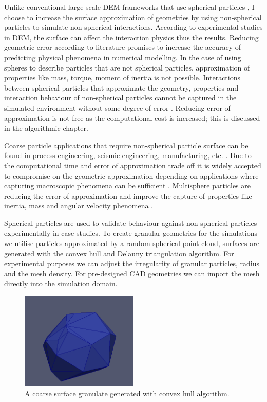 \documentclass[times,12pt]{article}
\begin{document}
Unlike conventional large scale DEM frameworks that use spherical particles \cite{Garcia2009, Hohner2014}, I choose to increase the surface approximation of geometries by using non-spherical particles to simulate non-spherical interactions. According to experimental studies \cite{Kruggel-Emden2008} in DEM, the surface can affect the interaction physics thus the results. Reducing geometric error according to  literature \cite{Li2015} promises to increase the accuracy of predicting physical phenomena in numerical modelling. In the case of using spheres to describe particles that are not spherical particles, approximation of properties like mass, torque, moment of inertia is not possible. Interactions between spherical particles that approximate the geometry, properties and interaction behaviour of non-spherical particles cannot be captured in the simulated environment without some degree of error \cite{Markauskas2010}. Reducing error of approximation is not free as the computational cost is increased; this is discussed in the algorithmic chapter.

Coarse particle applications that require non-spherical particle surface can be found in process engineering, seismic engineering, manufacturing, etc. \cite{Parteli2013}. Due to the computational time and error of approximation trade off it is widely accepted to compromise on the geometric approximation depending on applications where capturing macroscopic phenomena can be sufficient \cite{Kruggel-Emden2008}. Multisphere particles are reducing the error of approximation and improve the capture of properties like inertia, mass and angular velocity phenomena \cite{Kruggel-Emden2008}.   

Spherical particles are used to validate behaviour against non-spherical particles experimentally in case studies. To create granular geometries for the simulations we utilise particles approximated by a random spherical point cloud, surfaces are generated with the convex hull and Delauny triangulation algorithm. For experimental purposes we can adjust the irregularity of granular particles, radius and the mesh density. For pre-designed CAD geometries we can import the mesh directly into the simulation domain. 

\begin{figure}[!h]
\centering
\includegraphics[width=0.5\textwidth]{sketches/coarse.png} \protect\caption{\label{granulate} A coarse surface granulate generated with convex hull algorithm.}
\end{figure} 
\end{document}
